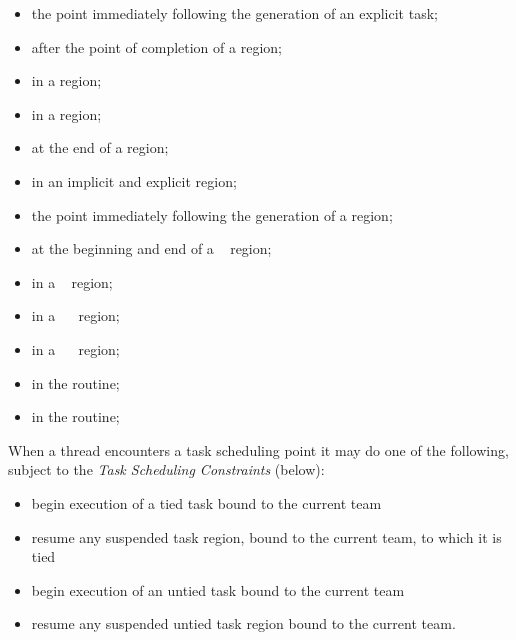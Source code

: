 \begin{itemize}
\item the point immediately following the generation of an explicit task;

\item after the point of completion of a  region;

\item in a  region;

\item in a  region;

\item at the end of a  region;

\item in an implicit and explicit  region;

\item the point immediately following the generation of a  region;

\item at the beginning and end of a ~ region;

\item in a ~ region;

\item in a ~~ region;

\item in a ~~ region;

\item in the  routine;

\item in the  routine;

\end{itemize}

When a thread encounters a task scheduling point it may do one of the following,
subject to the \emph{Task Scheduling Constraints} (below):

\begin{itemize}
\item begin execution of a tied task bound to the current team

\item resume any suspended task region, bound to the current team, to which it is tied

\item begin execution of an untied task bound to the current team

\item resume any suspended untied task region bound to the current team.
\end{itemize}

